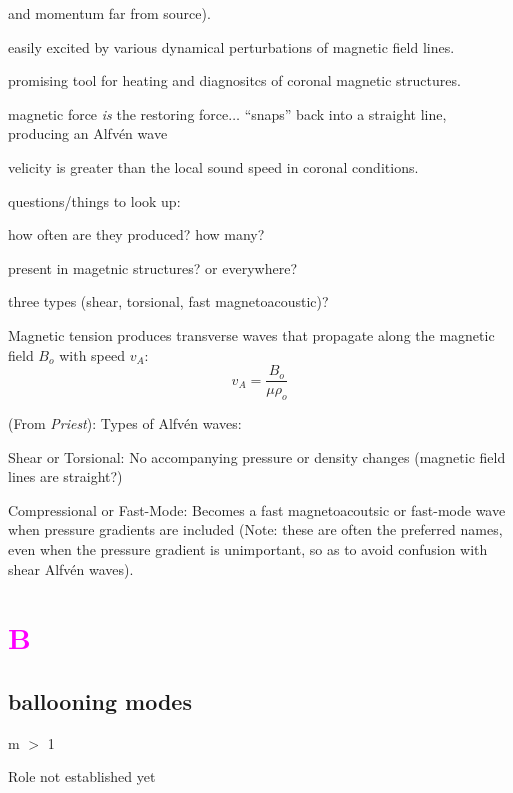 \documentclass[12pt]{article}
\begin{document}
\begin{itemize*}
        and momentum far from source).
    \item easily excited by various dynamical perturbations of magnetic field
        lines.
    \item promising tool for heating and diagnositcs of
        coronal magnetic structures.
    \item magnetic force \emph{is} the restoring force$\ldots$ ``snaps'' back
        into a straight line, producing an Alfv\'en wave
    \item velicity is greater than the local sound speed in coronal conditions.
    \item questions/things to look up:
        \begin{itemize*}
            \item how often are they produced? how many?
            \item present in magetnic structures? or everywhere?
            \item three types (shear, torsional, fast magnetoacoustic)?
        \end{itemize*}
    \item Magnetic tension produces transverse waves that propagate
        along the magnetic field $B_{o}$ with speed $v_{A}$:
        $$ v_{A} = \frac{B_o}{\mu\rho_o} $$
    \item (From \emph{Priest}): Types of Alfv\'en waves:
        \begin{itemize*}
            \item Shear or Torsional: No accompanying pressure or
            density changes (magnetic field lines are straight?)
            \item Compressional or Fast-Mode: Becomes a fast
            magnetoacoutsic or fast-mode wave when pressure gradients
            are included (Note: these are often the preferred names,
            even when the pressure gradient is unimportant, so as to
            avoid confusion with shear Alfv\'en waves).
        \end{itemize*}
\end{itemize*}

\section*{\textcolor{magenta}{B}}

\subsection*{ballooning modes}
\begin{itemize*}
    \item m $>$ 1
    \item Role not established yet
\end{itemize*}
\end{document}
